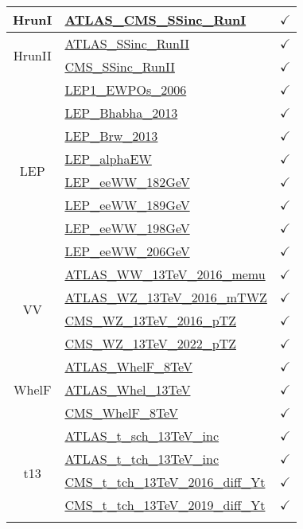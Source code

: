 \documentclass{article}
\begin{document}
\begin{longtable}{|c|l|c|}
\multirow{1}{*}{HrunI}
 & \href{https://arxiv.org}{ATLAS_CMS_SSinc_RunI}  & $\checkmark$
\\ \hline
\multirow{2}{*}{HrunII}
 & \href{https://arxiv.org}{ATLAS_SSinc_RunII}  & $\checkmark$\\ \cline{2-3}
 & \href{https://arxiv.org}{CMS_SSinc_RunII}  & $\checkmark$
\\ \hline
\multirow{8}{*}{LEP}
 & \href{https://arxiv.org}{LEP1_EWPOs_2006}  & $\checkmark$\\ \cline{2-3}
 & \href{https://arxiv.org}{LEP_Bhabha_2013}  & $\checkmark$\\ \cline{2-3}
 & \href{https://arxiv.org}{LEP_Brw_2013}  & $\checkmark$\\ \cline{2-3}
 & \href{https://arxiv.org}{LEP_alphaEW}  & $\checkmark$\\ \cline{2-3}
 & \href{https://arxiv.org}{LEP_eeWW_182GeV}  & $\checkmark$\\ \cline{2-3}
 & \href{https://arxiv.org}{LEP_eeWW_189GeV}  & $\checkmark$\\ \cline{2-3}
 & \href{https://arxiv.org}{LEP_eeWW_198GeV}  & $\checkmark$\\ \cline{2-3}
 & \href{https://arxiv.org}{LEP_eeWW_206GeV}  & $\checkmark$
\\ \hline
\multirow{4}{*}{VV}
 & \href{https://arxiv.org}{ATLAS_WW_13TeV_2016_memu}  & $\checkmark$\\ \cline{2-3}
 & \href{https://arxiv.org}{ATLAS_WZ_13TeV_2016_mTWZ}  & $\checkmark$\\ \cline{2-3}
 & \href{https://arxiv.org}{CMS_WZ_13TeV_2016_pTZ}  & $\checkmark$\\ \cline{2-3}
 & \href{https://arxiv.org}{CMS_WZ_13TeV_2022_pTZ}  & $\checkmark$
\\ \hline
\multirow{3}{*}{WhelF}
 & \href{https://arxiv.org}{ATLAS_WhelF_8TeV}  & $\checkmark$\\ \cline{2-3}
 & \href{https://arxiv.org}{ATLAS_Whel_13TeV}  & $\checkmark$\\ \cline{2-3}
 & \href{https://arxiv.org}{CMS_WhelF_8TeV}  & $\checkmark$
\\ \hline
\multirow{5}{*}{t13}
 & \href{https://arxiv.org}{ATLAS_t_sch_13TeV_inc}  & $\checkmark$\\ \cline{2-3}
 & \href{https://arxiv.org}{ATLAS_t_tch_13TeV_inc}  & $\checkmark$\\ \cline{2-3}
 & \href{https://arxiv.org}{CMS_t_tch_13TeV_2016_diff_Yt}  & $\checkmark$\\ \cline{2-3}
 & \href{https://arxiv.org}{CMS_t_tch_13TeV_2019_diff_Yt}  & $\checkmark$\\ \cline{2-3}

\end{longtable}
\end{document}
